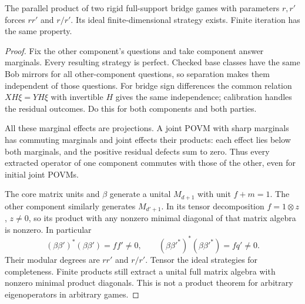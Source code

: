 \begin{lemma}\label{lem:product}
The parallel product of two rigid full-support bridge games with parameters $r,r'$ forces $rr'$ and $r/r'$. Its ideal finite-dimensional strategy exists. Finite iteration has the same property.
\end{lemma}
\begin{proof}
Fix the other component's questions and take component answer marginals. Every resulting strategy is perfect. Checked base classes have the same Bob mirrors for all other-component questions, so separation makes them independent of those questions. For bridge sign differences the common relation $XH\xi=YH\xi$ with invertible $H$ gives the same independence; calibration handles the residual outcomes. Do this for both components and both parties.

All these marginal effects are projections. A joint POVM with sharp marginals has commuting marginals and joint effects their products: each effect lies below both marginals, and the positive residual defects sum to zero. Thus every extracted operator of one component commutes with those of the other, even for initial joint POVMs.

The core matrix units and $\beta$ generate a unital $M_{d+1}$ with unit $f+m=1$. The other component similarly generates $M_{d'+1}$. In its tensor decomposition $f=1\otimes z$, $z\ne0$, so its product with any nonzero minimal diagonal of that matrix algebra is nonzero. In particular
\[
 (\beta\beta')^*(\beta\beta')=ff'\ne0,\qquad
 (\beta\beta'^*)^*(\beta\beta'^*)=fq'\ne0.
\]
Their modular degrees are $rr'$ and $r/r'$. Tensor the ideal strategies for completeness. Finite products still extract a unital full matrix algebra with nonzero minimal product diagonals. This is not a product theorem for arbitrary eigenoperators in arbitrary games.
\end{proof}

